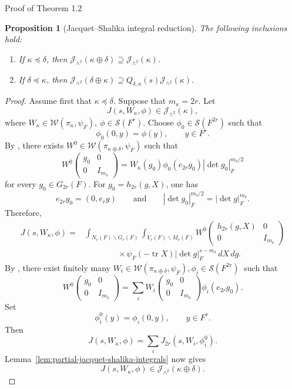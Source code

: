 \documentclass[12pt,reqno]{amsart}
\numberwithin{equation}{section}%
\numberwithin{equation}{subsection}
\newtheorem{prop}[equation]{Proposition}
\theoremstyle{definition}
\theoremstyle{remark}
\begin{document}
\begin{section}{Proof of Theorem 1.2}
\begin{prop}[Jacquet--Shalika integral reduction]
\label{prop:exterior-square-integral-inclusions}
The following inclusions hold:
\begin{enumerate}[label=(\arabic*)]
    \item If $\kappa \preceq \delta$, then $\mathcal{J}_{\wedge^2}(\kappa \oplus \delta) \supseteq \mathcal{J}_{\wedge^2}(\kappa)$.
    \item If $\delta \preceq \kappa$, then $\mathcal{J}_{\wedge^2}(\delta \oplus \kappa) \supseteq Q_{\delta,\kappa}(s)\mathcal{J}_{\wedge^2}(\kappa)$.
\end{enumerate}
\end{prop}
\begin{proof}
Assume first that $\kappa\preceq\delta$. Suppose that $m_\kappa=2r$. Let
\[
J(s,W_\kappa,\phi)
\in
\mathcal{J}_{\wedge^2}(\kappa),
\]
where $W_\kappa\in\mathcal{W}(\pi_\kappa,\psi_F),\>
\phi\in\mathcal{S}(F^r).$
Choose $\phi_0\in\mathcal{S}(F^{2r})$ such that
\[
\phi_0(0,y)=\phi(y),
\qquad y\in F^r.
\]
By \cite[Proposition~14.1]{Jac2009}, there exists
$W^0\in\mathcal{W}(\pi_{\kappa\oplus\delta},\psi_F)$ such that
\[
W^0
\begin{pmatrix}
g_0&0\\
0&I_{m_\delta}
\end{pmatrix}
=
W_\kappa(g_0)\phi_0(e_{2r}g_0)
|\det g_0|_F^{m_\delta/2}
\]
for every $g_0\in G_{2r}(F)$. For $g_0=h_{2r}(g,X)$, one has
\[
e_{2r}g_0=(0,e_rg)
\qquad\text{and}\qquad
|\det g_0|_F^{m_\delta/2}=|\det g|_F^{m_\delta}.
\]
Therefore,
\[
\begin{aligned}
J(s,W_\kappa,\phi)
={}&
\int_{N_r(F)\backslash G_r(F)}
\int_{V_r(F)\backslash M_r(F)}
W^0\left(
\begin{array}{cc}
h_{2r}(g,X)&0\\
0&I_{m_\delta}
\end{array}
\right)\\
&\qquad\qquad\times
\psi_F(-\operatorname{tr}X)
|\det g|_F^{s-m_\delta}\,dX\,dg.
\end{aligned}
\]
By \cite[Proposition~6.1]{Jac2009}, there
exist finitely many $W_i\in\mathcal{W}(\pi_{\kappa\oplus\delta},\psi_F), \phi_i\in\mathcal{S}(F^{2r})\>
$
such that
\[
W^0
\begin{pmatrix}
g_0&0\\
0&I_{m_\delta}
\end{pmatrix}
=
\sum_i
W_i
\begin{pmatrix}
g_0&0\\
0&I_{m_\delta}
\end{pmatrix}
\phi_i(e_{2r}g_0).
\]
Set
\[
\phi_i^0(y)=\phi_i(0,y),
\qquad y\in F^r.
\]
Then
\[
J(s,W_\kappa,\phi)
=
\sum_iJ_{2r}(s,W_i,\phi_i^0).
\]
Lemma~\ref{lem:partial-jacquet-shalika-integrals} now gives
\[
J(s,W_\kappa,\phi)
\in
\mathcal{J}_{\wedge^2}(\kappa\oplus\delta).
\]


\end{proof}
\end{section}
\end{document}

